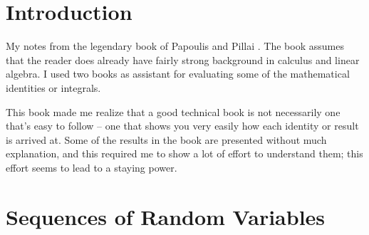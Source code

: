 \documentclass[a4paper]{book}
\begin{document}
\chapter*{Introduction}

My notes from the legendary book of Papoulis and Pillai \cite{papoulis02}. The book assumes that the reader does already have fairly strong background in calculus and linear algebra. I used two books \cite{Gradshteyn80, Abramowitz70} as assistant for evaluating some of the mathematical identities or integrals. 

This book made me realize that a good technical book is not necessarily one that's easy to follow -- one that shows you very easily how each identity or result is arrived at. Some of the results in the book are presented without much explanation, and this required me to show a lot of effort to understand them; this effort seems to lead to a staying power. 


\chapter{Sequences of Random Variables}
\end{document}
